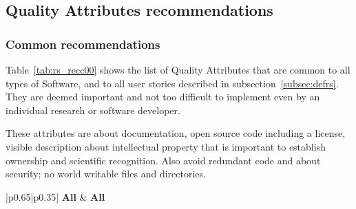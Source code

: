 \subsection{Quality Attributes recommendations}

\subsubsection{Common recommendations}

Table~\ref{tab:rs_recc00} shows the list of Quality Attributes that are common to all types of Software, and to all user stories described in subsection~\ref{subsec:defrs}. They are deemed important and not too difficult to implement even by an individual research or software developer.

These attributes are about documentation, open source code including a license, visible description about intellectual property that is important to establish ownership and scientific recognition. Also avoid redundant code and about security; no world writable files and directories.

\begin{center}
    \tabletail{\hline}
    \label{tab:rs_recc00}
    \small
    \begin{supertabular}{|p{0.65\linewidth}|p{0.35\linewidth}|} \hline
    \textbf{All} &
    \textbf{All} \\ \hline \hline

     \\ \hline
     \\ \hline
     \\ \hline
     \\ \hline
     \\ \hline
     \\ \hline
     \\ \hline
     \\ \hline
     \\ \hline
     \\ \hline

\end{supertabular}
\end{center}

